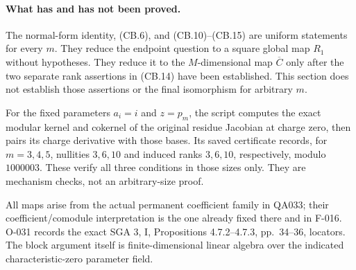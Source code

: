 \paragraph{What has and has not been proved.}
The normal-form identity, (CB.6), and (CB.10)--(CB.15) are
uniform statements for every \(m\). They reduce the endpoint
question to a square global map \(R_1\) without hypotheses.
They reduce it to the \(M\)-dimensional map \(\overline C\)
only after the two separate rank assertions in (CB.14)
have been established. This section does not establish
those assertions or the final isomorphism for arbitrary
\(m\).

For the fixed parameters \(a_i=i\) and \(z=p_m\), the script
computes the exact modular kernel and cokernel of the original
residue Jacobian at charge zero, then pairs its charge
derivative with those bases. Its saved certificate
records, for \(m=3,4,5\), nullities \(3,6,10\) and induced
ranks \(3,6,10\), respectively, modulo \(1000003\).
These verify all three conditions in those sizes only.
They are mechanism checks, not an arbitrary-size proof.

All maps arise from the actual permanent coefficient family
in QA033; their coefficient/comodule interpretation is the
one already fixed there and in F-016. O-031 records the exact
SGA 3, I, Propositions 4.7.2--4.7.3, pp.~34--36, locators.
The block argument itself is finite-dimensional linear algebra
over the indicated characteristic-zero parameter field.
